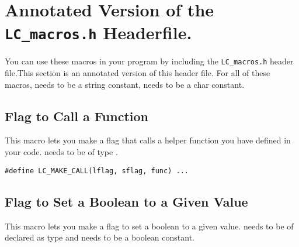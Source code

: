 %
%
%

\section{Annotated Version of the \texttt{LC_macros.h} Headerfile.}

You can use these macros in your program by including the \texttt{LC_macros.h} header file.\footnotemark This section is an annotated version of this header file. For all of these macros,  needs to be a string constant,  needs to be a char constant.


\subsection{Flag to Call a Function}
This macro lets you make a flag that calls a helper function you have defined in your code.  needs to be of type .\footnotemark


\begin{verbatim}
#define LC_MAKE_CALL(lflag, sflag, func) ...
\end{verbatim}

\subsection{Flag to Set a Boolean to a Given Value}
This macro lets you make a flag to set a boolean to a given value.  needs to be of declared as type  and  needs to be a boolean constant.

